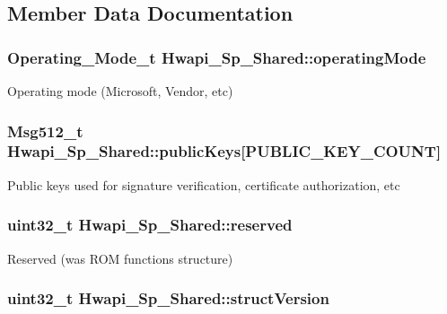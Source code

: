 \subsection{Member Data Documentation}
\hypertarget{structHwapi__1Sp__Shared_ad354953dd9bfa3140e0999f458f0dc50}{
\subsubsection[{operating\-Mode}]{\setlength{\rightskip}{0pt plus 5cm}Operating\-\_\-\-Mode\-\_\-t Hwapi\-\_\-Sp\-\_\-\-Shared\-::operating\-Mode}}\label{structHwapi__1Sp__Shared_ad354953dd9bfa3140e0999f458f0dc50}
Operating mode (Microsoft, Vendor, etc) \hypertarget{structHwapi__1Sp__Shared_a592636290a907609eb10428f76ebeb48}{
\subsubsection[{public\-Keys}]{\setlength{\rightskip}{0pt plus 5cm}Msg512\-\_\-t Hwapi\-\_\-Sp\-\_\-\-Shared\-::public\-Keys\mbox{[}P\-U\-B\-L\-I\-C\-\_\-\-K\-E\-Y\-\_\-\-C\-O\-U\-N\-T\mbox{]}}}\label{structHwapi__1Sp__Shared_a592636290a907609eb10428f76ebeb48}
Public keys used for signature verification, certificate authorization, etc \hypertarget{structHwapi__1Sp__Shared_ad72f4ce5b2ca22b7da364504466e1dbe}{
\subsubsection[{reserved}]{\setlength{\rightskip}{0pt plus 5cm}uint32\-\_\-t Hwapi\-\_\-Sp\-\_\-\-Shared\-::reserved}}\label{structHwapi__1Sp__Shared_ad72f4ce5b2ca22b7da364504466e1dbe}
Reserved (was R\-O\-M functions structure) \hypertarget{structHwapi__1Sp__Shared_a47f4dd2e05f5b32d6c5742d55a164d22}{
\subsubsection[{struct\-Version}]{\setlength{\rightskip}{0pt plus 5cm}uint32\-\_\-t Hwapi\-\_\-Sp\-\_\-\-Shared\-::struct\-Version}}\label{structHwapi__1Sp__Shared_a47f4dd2e05f5b32d6c5742d55a164d22}
